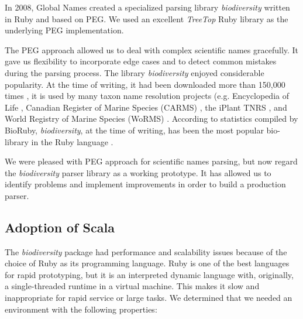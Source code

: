 \documentclass{bmcart}
\begin{document}
In 2008, Global Names created a specialized parsing library
\textit{biodiversity} \cite{biodiversity} written in Ruby and based on PEG. We used an excellent \textit{TreeTop} Ruby library \cite{treetop} as the underlying PEG implementation.

The PEG approach allowed us to deal with complex scientific names gracefully.
It gave us flexibility to incorporate edge cases and to detect common mistakes
during the parsing process. The library \textit{biodiversity} enjoyed
considerable popularity. At the time of writing, it had been downloaded more
than 150,000 times \cite{bdiv-downloads}, it is used by many taxon name
resolution projects (e.g. Encyclopedia of Life \cite{eol}, Canadian Register of
Marine Species (CARMS) \cite{carms}, the iPlant TNRS \cite{iplant}, and World
Registry of Marine Species (WoRMS) \cite{worms}.  According to statistics compiled by BioRuby, \textit{biodiversity}, at the time of writing, has been the most
popular bio-library in the Ruby language \cite{biogems}.

We were pleased with PEG approach for scientific names parsing, but now regard
the \textit{biodiversity} parser library as a working prototype. It has  allowed us
to identify problems and implement improvements in order to build a production parser.

\subsection*{Adoption of Scala}

The \textit{biodiversity} package had performance and scalability issues because
of the choice of Ruby as its programming language. Ruby is one of the best
languages for rapid prototyping, but it is an interpreted dynamic language with,
originally, a single-threaded runtime in a virtual machine. This makes it slow
and inappropriate for rapid service or large tasks. We determined that we
needed an environment with the following properties:
\end{document}
